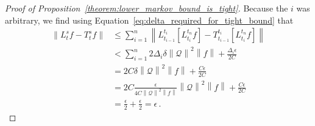 \documentclass[10pt]{paper}
\theoremstyle{definition}
\newcommand{\rateset}{\mathcal{Q}}
\newcommand{\lrate}{\underline{Q}}
\newcommand{\norm}[1]{\left\lVert #1 \right\rVert}
\begin{document}
\begin{proof}[Proof of Proposition~\ref{theorem:lower_markov_bound_is_tight}]
Because the $i$ was arbitrary, we find using Equation~\eqref{eq:delta_required_for_tight_bound} that
\begin{align*}
\norm{L_t^sf - T_t^sf} &\leq \sum_{i=1}^n \norm{L_{t_{i-1}}^{t_i}\left[L_{t_i}^{t_n}f\right] - T_{t_{i-1}}^{t_i}\left[L_{t_i}^{t_n}f\right]} \\
 &< \sum_{i=1}^n 2\Delta_i\delta\norm{\mathcal{Q}}^2\norm{f} + \frac{\Delta_i\epsilon}{2C} \\
 &= 2C\delta\norm{\mathcal{Q}}^2\norm{f} + \frac{C\epsilon}{2C} \\
 &= 2C\frac{\epsilon}{4C\norm{\rateset}^2\norm{f}}\norm{\mathcal{Q}}^2\norm{f} + \frac{C\epsilon}{2C} \\
 &= \frac{\epsilon}{2} + \frac{\epsilon}{2} = \epsilon\,.
\end{align*}
%

\end{proof}
\end{document}
